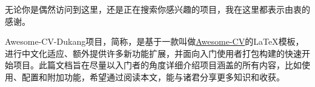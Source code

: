 \makelettertitle\newline
\begin{cvletter}
{\hspace{2em}}无论你是偶然访问到这里，还是正在搜索你感兴趣的项目，我在这里都表示由衷的感谢。

{\hspace{2em}}Awesome-CV-Dukang项目，简称{\dk}，是基于一款叫做\hyperref{https://github.com/posquit0/Awesome-CV}{}{}{Awesome-CV}的{\LaTeX}模板，进行中文化适应、额外提供许多新功能扩展，并面向入门使用者打包构建的快速开始项目。此篇文档旨在尽量以入门者的角度详细介绍{\dk}项目涵盖的所有内容，比如使用、配置和附加功能，希望通过阅读本文，能与诸君分享更多知识和收获。
\end{cvletter}

\makeletterclosing\newline


\clearpage
